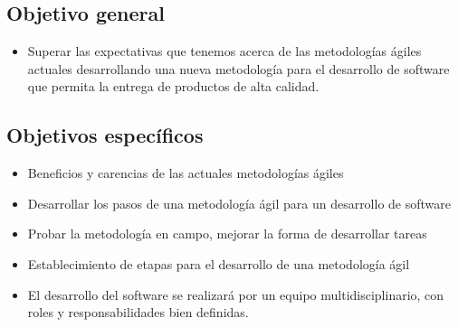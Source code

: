 \subsection{Objetivo general}
	\begin{itemize}
		\item Superar las expectativas que tenemos acerca de las metodologías ágiles actuales desarrollando una nueva metodología para el desarrollo de software que permita la
		entrega de productos de alta calidad.
	\end{itemize}
	
\subsection{Objetivos específicos}
	\begin{itemize}
		\item Beneficios y carencias de las actuales metodologías ágiles
		\item Desarrollar los pasos de una metodología ágil para un desarrollo de software
		\item Probar la metodología en campo, mejorar la forma de desarrollar tareas
		\item Establecimiento de etapas para el desarrollo de una metodología ágil
		\item El desarrollo del software se realizará por un equipo multidisciplinario, con roles y responsabilidades bien definidas.
	\end{itemize}